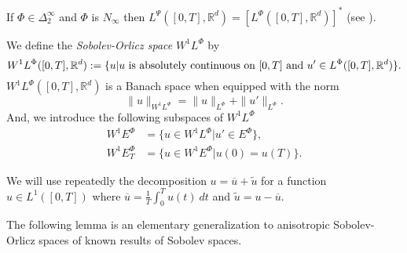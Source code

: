 \documentclass[twoside]{article}
\theoremstyle{remark}
\newcommand{\orlnor}{\|_{L^{\Phi}}}
\newcommand{\lphi}{L^{\Phi}}
\newcommand{\lpsi}{L^{\Psi}}
\newcommand{\ephi}{E^{\Phi}}
\newcommand{\wphi}{W^{1}\lphi}
\newcommand{\wphie}{W^{1}\ephi}
\newcommand{\rr}{\mathbb{R}}
\renewcommand{\leq}{\leqslant}
\newcounter{example}
\begin{document}
 If $\Phi \in \Delta_2^{\infty}$ and $\Phi$ is $N_{\infty}$ then $\lpsi([0,T],\rr^d)= \left[\lphi([0,T],\rr^d)\right]^*$  (see \cite[Thm. 2.9 , Thm. 2.10]{Desch2001}).





We define the \emph{Sobolev-Orlicz space} $\wphi$ by
\[\wphi([0,T],\rr^d):=\{u| u \hbox{ is absolutely continuous on $[0,T]$ and } u'\in \lphi([0,T],\rr^d)\}.\]
$\wphi([0,T],\rr^d)$ is a Banach space when equipped with the norm
\begin{equation}\label{def-norma-orlicz-sob}
\|  u  \|_{\wphi}= \|  u  \|_{\lphi} + \|u'\orlnor.
\end{equation}
And, we introduce the following subspaces of $\wphi$
\begin{equation}\label{def-esp-orlicz-sob-per}
\begin{split}
\wphie&=\{u\in\wphi|u'\in\ephi\},\\
\wphie_T&=\{u\in\wphie|u(0)=u(T)\}.
\end{split}
\end{equation}

%
%
 We will use repeatedly the decomposition $u=\overline{u}+\widetilde{u}$ for a function $u\in L^1([0,T])$  where $\overline{u} =\frac1T\int_0^T u(t)\ dt$ and $\widetilde{u}=u-\overline{u}$.

 The following lemma is an elementary generalization to anisotropic Sobolev-Orlicz spaces of known results of Sobolev spaces.


%
%
%
%
%
%
%
%
%
%
\end{document}
